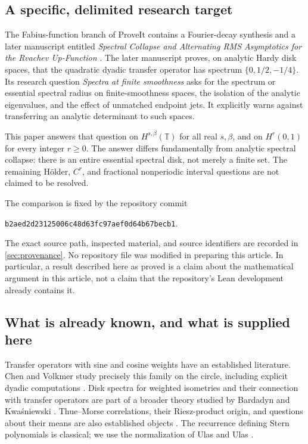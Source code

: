 \documentclass[11pt,a4paper]{article}
\theoremstyle{definition}
\theoremstyle{remark}
\newcommand{\T}{\mathbb T}
\numberwithin{equation}{section}
\begin{document}
\subsection{A specific, delimited research target}
The Fabius-function branch of ProveIt contains a Fourier-decay synthesis and
a later manuscript entitled \emph{Spectral Collapse and Alternating RMS
Asymptotics for the Rvachev Up-Function} \cite{repo-spectral,repo-fourier}.
The later manuscript proves, on analytic Hardy disk spaces, that the quadratic
dyadic transfer operator has spectrum $\{0,1/2,-1/4\}$. Its research question
\emph{Spectra at finite smoothness} asks for the spectrum or essential spectral
radius on finite-smoothness spaces, the isolation of the analytic eigenvalues,
and the effect of unmatched endpoint jets. It explicitly warns against
transferring an analytic determinant to such spaces.

This paper answers that question on $H^{s,\beta}(\T)$ for all real $s,\beta$,
and on $H^r(0,1)$ for every integer $r\ge0$. The answer differs fundamentally
from analytic spectral collapse: there is an entire essential spectral disk,
not merely a finite set. The remaining H\"older, $C^r$, and fractional
nonperiodic interval questions are not claimed to be resolved.

The comparison is fixed by the repository commit
\begin{center}\small\texttt{b2aed2d23125006c48d63fc97aef0d64b67becb1}.\end{center}
The exact source path, inspected material, and source identifiers are recorded
in \cref{sec:provenance}. No repository file was modified in preparing this
article. In particular, a result described here as proved is a claim about
the mathematical argument in this article, not a claim that the repository's
Lean development already contains it.

\subsection{What is already known, and what is supplied here}
Transfer operators with sine and cosine weights have an established
literature. Chen and Volkmer study precisely this family on the circle,
including explicit dyadic computations \cite{chen-volkmer}. Disk spectra
for weighted isometries and their connection with transfer operators are
part of a broader theory studied by Bardadyn and Kwa\'sniewski
\cite{bardadyn-kwasniewski}. Thue--Morse correlations, their Riesz-product
origin, and questions about their means are also established objects
\cite{baake-coons}. The recurrence defining Stern polynomials is classical;
we use the normalization of Ulas and Ulas \cite{ulas-ulas}.
\end{document}

